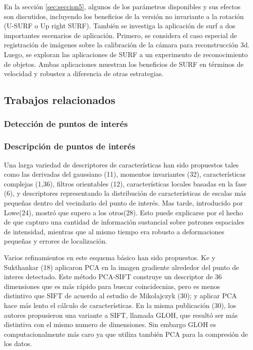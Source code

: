   En la sección \ref{sec:seccion5}, algunos de los parámetros disponibles y sus efectos son discutidos, incluyendo los beneficios de la versión no invariante a la rotación (U-SURF o Up right SURF). También se investiga la aplicación de surf a dos importantes escenarios de aplicación. Primero, se considera el caso especial de registración de imágenes sobre la calibración de la cámara para reconstrucción 3d. Luego, se exploran las aplicaciones de SURF a un experimento de reconocimiento de objetos. Ambas aplicaciones muestran los beneficios de SURF en términos de velocidad y robustez a diferencia de otras estrategias.

\subsection{Trabajos relacionados}
  \subsubsection{Detección de puntos de interés}
  

  \subsubsection{Descripción de puntos de interés}
  Una larga variedad de descriptores de características han sido propuestos tales como las derivadas del gaussiano (11), momentos invariantes (32), características complejas (1,36), filtros orientables (12), características locales basadas en la fase (6), y descriptores representando la distribución de características de escalas más pequeñas dentro del vecindario del punto de interés. Mas tarde, introducido por Lowe(24), mostró que supero a los otros(28). Esto puede explicarse por el hecho de que capturo una cantidad de información sustancial sobre patrones espaciales de intensidad, mientras que al mismo tiempo era robusto a deformaciones pequeñas y errores de localización. 

  Varios refinamientos en este esquema básico han sido propuestos. Ke y Sukthankar (18) aplicaron PCA en la imagen gradiente alrededor del punto de interes detectado. Este método PCA-SIFT construye un descriptor de 36 dimensiones que es más rápido para buscar coincidecnias, pero es menos distintivo que SIFT de acuerdo al estudio de Mikolajczyk (30);  y aplicar PCA hace más lento el cálculo de características. En la misma publicación (30), los autores propusieron una variante a SIFT, llamada GLOH, que resultó ser más distintiva con el mismo numero de dimensiones. Sin embargo GLOH es computacionalmente más caro ya que utiliza también PCA para la compresión de los datos.

